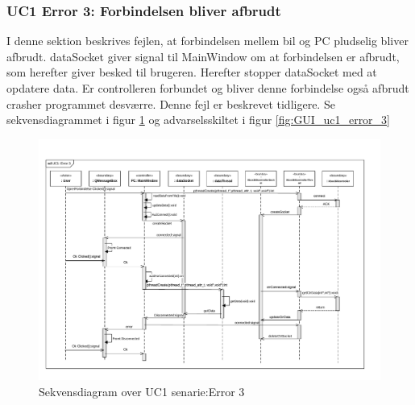\subsubsection{UC1 Error 3: Forbindelsen bliver afbrudt}
I denne sektion beskrives fejlen, at forbindelsen mellem bil og PC pludselig bliver afbrudt. dataSocket giver signal til MainWindow om at forbindelsen er afbrudt, som herefter giver besked til brugeren. Herefter stopper dataSocket med at opdatere data. Er controlleren forbundet og bliver denne forbindelse også afbrudt crasher programmet desværre. Denne fejl er beskrevet tidligere. Se sekvensdiagrammet i figur \ref{fig:cd_uc1_error_3} og advarselsskiltet i figur \ref{fig:GUI_uc1_error_3} 

\begin{figure}[H]
\centering
\includegraphics[width=\textwidth* 1,height=\textwidth* 1 ]{../fig/diagrammer/pc/sd_uc1_Error_3.pdf}
\caption{Sekvensdiagram over UC1 senarie:Error 3}
\label{fig:cd_uc1_error_3}
\end{figure}

